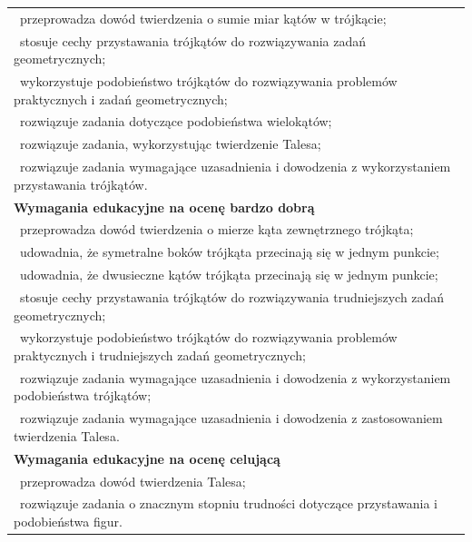 \documentclass[12pt,a4paper]{article}
\begin{document}
\begin{longtable}{|p{16cm}|}
		\textbullet\ przeprowadza dowód twierdzenia o sumie miar kątów w trójkącie; \\
		
		\textbullet\ stosuje cechy przystawania trójkątów do rozwiązywania zadań geometrycznych; \\
		
		\textbullet\ wykorzystuje podobieństwo trójkątów do rozwiązywania problemów praktycznych i zadań geometrycznych; \\
		
		\textbullet\ rozwiązuje zadania dotyczące podobieństwa wielokątów; \\
		
		\textbullet\ rozwiązuje zadania, wykorzystując twierdzenie Talesa; \\
		
		\textbullet\ rozwiązuje zadania wymagające uzasadnienia i dowodzenia z wykorzystaniem przystawania trójkątów. \\ \hline
		
		\textbf{Wymagania edukacyjne na ocenę bardzo dobrą} \\ \hline
		
		\textbullet\ przeprowadza dowód twierdzenia o mierze kąta zewnętrznego trójkąta; \\
		
		\textbullet\ udowadnia, że symetralne boków trójkąta przecinają się w jednym punkcie; \\
		
		\textbullet\ udowadnia, że dwusieczne kątów trójkąta przecinają się w jednym punkcie; \\
		
		\textbullet\ stosuje cechy przystawania trójkątów do rozwiązywania trudniejszych zadań geometrycznych; \\
		
		\textbullet\ wykorzystuje podobieństwo trójkątów do rozwiązywania problemów praktycznych i trudniejszych zadań geometrycznych; \\
		
		\textbullet\ rozwiązuje zadania wymagające uzasadnienia i dowodzenia z wykorzystaniem podobieństwa trójkątów; \\
		
		\textbullet\ rozwiązuje zadania wymagające uzasadnienia i dowodzenia z zastosowaniem twierdzenia Talesa. \\ \hline
		
		\textbf{Wymagania edukacyjne na ocenę celującą} \\ \hline
		
		\textbullet\ przeprowadza dowód twierdzenia Talesa; \\
		
		\textbullet\ rozwiązuje zadania o znacznym stopniu trudności dotyczące przystawania i podobieństwa figur. \\ \hline
		
	\end{longtable}
	
\end{document}
